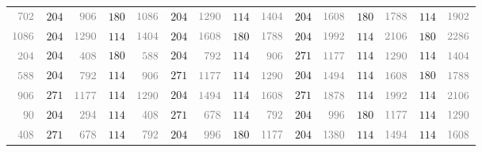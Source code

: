 \begin{tabular}{rrrrrrrrrrrrrrr}
\tiny $\mathcolor{gray}{702}$ & \small ${204}$ & \tiny $\mathcolor{gray}{906}$ & \small ${180}$ & \tiny $\mathcolor{gray}{1086}$ & \small ${204}$ & \tiny $\mathcolor{gray}{1290}$ & \small ${114}$ & \tiny $\mathcolor{gray}{1404}$ & \small ${204}$ & \tiny $\mathcolor{gray}{1608}$ & \small ${180}$ & \tiny $\mathcolor{gray}{1788}$ & \small ${114}$ & \tiny $\mathcolor{gray}{1902}$ \\
\tiny $\mathcolor{gray}{1086}$ & \small ${204}$ & \tiny $\mathcolor{gray}{1290}$ & \small ${114}$ & \tiny $\mathcolor{gray}{1404}$ & \small ${204}$ & \tiny $\mathcolor{gray}{1608}$ & \small ${180}$ & \tiny $\mathcolor{gray}{1788}$ & \small ${204}$ & \tiny $\mathcolor{gray}{1992}$ & \small ${114}$ & \tiny $\mathcolor{gray}{2106}$ & \small ${180}$ & \tiny $\mathcolor{gray}{2286}$ \\
\tiny $\mathcolor{gray}{204}$ & \small ${204}$ & \tiny $\mathcolor{gray}{408}$ & \small ${180}$ & \tiny $\mathcolor{gray}{588}$ & \small ${204}$ & \tiny $\mathcolor{gray}{792}$ & \small ${114}$ & \tiny $\mathcolor{gray}{906}$ & \small ${271}$ & \tiny $\mathcolor{gray}{1177}$ & \small ${114}$ & \tiny $\mathcolor{gray}{1290}$ & \small ${114}$ & \tiny $\mathcolor{gray}{1404}$ \\
\tiny $\mathcolor{gray}{588}$ & \small ${204}$ & \tiny $\mathcolor{gray}{792}$ & \small ${114}$ & \tiny $\mathcolor{gray}{906}$ & \small ${271}$ & \tiny $\mathcolor{gray}{1177}$ & \small ${114}$ & \tiny $\mathcolor{gray}{1290}$ & \small ${204}$ & \tiny $\mathcolor{gray}{1494}$ & \small ${114}$ & \tiny $\mathcolor{gray}{1608}$ & \small ${180}$ & \tiny $\mathcolor{gray}{1788}$ \\
\tiny $\mathcolor{gray}{906}$ & \small ${271}$ & \tiny $\mathcolor{gray}{1177}$ & \small ${114}$ & \tiny $\mathcolor{gray}{1290}$ & \small ${204}$ & \tiny $\mathcolor{gray}{1494}$ & \small ${114}$ & \tiny $\mathcolor{gray}{1608}$ & \small ${271}$ & \tiny $\mathcolor{gray}{1878}$ & \small ${114}$ & \tiny $\mathcolor{gray}{1992}$ & \small ${114}$ & \tiny $\mathcolor{gray}{2106}$ \\
\tiny $\mathcolor{gray}{90}$ & \small ${204}$ & \tiny $\mathcolor{gray}{294}$ & \small ${114}$ & \tiny $\mathcolor{gray}{408}$ & \small ${271}$ & \tiny $\mathcolor{gray}{678}$ & \small ${114}$ & \tiny $\mathcolor{gray}{792}$ & \small ${204}$ & \tiny $\mathcolor{gray}{996}$ & \small ${180}$ & \tiny $\mathcolor{gray}{1177}$ & \small ${114}$ & \tiny $\mathcolor{gray}{1290}$ \\
\tiny $\mathcolor{gray}{408}$ & \small ${271}$ & \tiny $\mathcolor{gray}{678}$ & \small ${114}$ & \tiny $\mathcolor{gray}{792}$ & \small ${204}$ & \tiny $\mathcolor{gray}{996}$ & \small ${180}$ & \tiny $\mathcolor{gray}{1177}$ & \small ${204}$ & \tiny $\mathcolor{gray}{1380}$ & \small ${114}$ & \tiny $\mathcolor{gray}{1494}$ & \small ${114}$ & \tiny $\mathcolor{gray}{1608}$ \\
\end{tabular}
